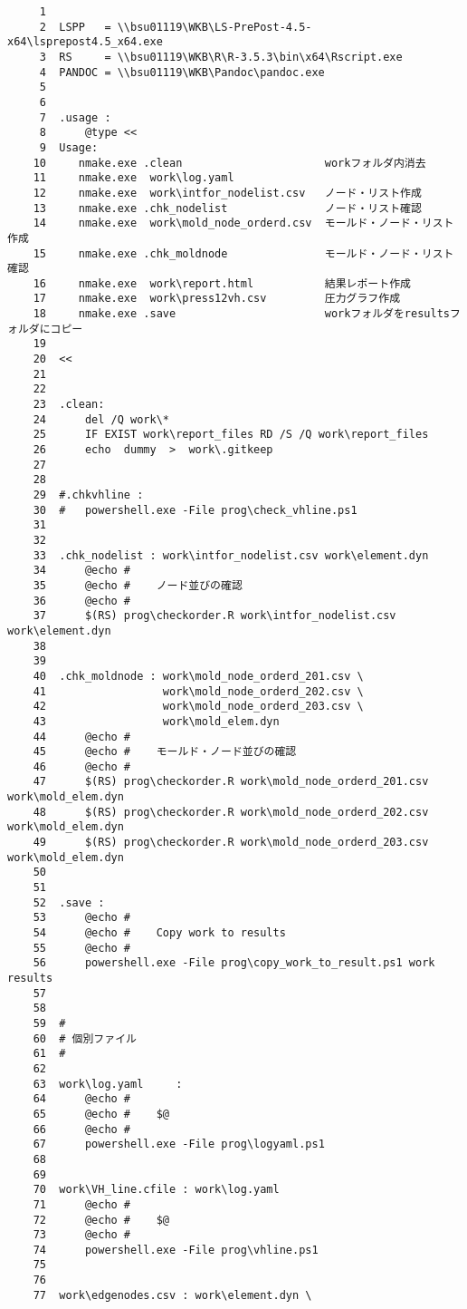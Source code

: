 \documentclass[dvipdfmx]{jsarticle}
\begin{document}
\begin{verbatim}
     1	
     2	LSPP   = \\bsu01119\WKB\LS-PrePost-4.5-x64\lsprepost4.5_x64.exe
     3	RS     = \\bsu01119\WKB\R\R-3.5.3\bin\x64\Rscript.exe
     4	PANDOC = \\bsu01119\WKB\Pandoc\pandoc.exe
     5	
     6	
     7	.usage :
     8		@type <<
     9	Usage:
    10	   nmake.exe .clean                      workフォルダ内消去
    11	   nmake.exe  work\log.yaml
    12	   nmake.exe  work\intfor_nodelist.csv   ノード・リスト作成
    13	   nmake.exe .chk_nodelist               ノード・リスト確認
    14	   nmake.exe  work\mold_node_orderd.csv  モールド・ノード・リスト作成
    15	   nmake.exe .chk_moldnode               モールド・ノード・リスト確認
    16	   nmake.exe  work\report.html           結果レポート作成
    17	   nmake.exe  work\press12vh.csv         圧力グラフ作成
    18	   nmake.exe .save                       workフォルダをresultsフォルダにコピー
    19	
    20	<<
    21	
    22	
    23	.clean:
    24		del /Q work\*
    25		IF EXIST work\report_files RD /S /Q work\report_files
    26		echo  dummy  >  work\.gitkeep
    27	
    28	
    29	#.chkvhline :
    30	#	powershell.exe -File prog\check_vhline.ps1
    31	
    32	
    33	.chk_nodelist : work\intfor_nodelist.csv work\element.dyn
    34		@echo #
    35		@echo #    ノード並びの確認
    36		@echo #
    37		$(RS) prog\checkorder.R work\intfor_nodelist.csv work\element.dyn
    38	
    39	
    40	.chk_moldnode : work\mold_node_orderd_201.csv \
    41	                work\mold_node_orderd_202.csv \
    42	                work\mold_node_orderd_203.csv \
    43					work\mold_elem.dyn
    44		@echo #
    45		@echo #    モールド・ノード並びの確認
    46		@echo #
    47		$(RS) prog\checkorder.R work\mold_node_orderd_201.csv work\mold_elem.dyn
    48		$(RS) prog\checkorder.R work\mold_node_orderd_202.csv work\mold_elem.dyn
    49		$(RS) prog\checkorder.R work\mold_node_orderd_203.csv work\mold_elem.dyn
    50	
    51	
    52	.save :
    53		@echo #
    54		@echo #    Copy work to results
    55		@echo #
    56		powershell.exe -File prog\copy_work_to_result.ps1 work results
    57	
    58	
    59	#
    60	# 個別ファイル
    61	#
    62	
    63	work\log.yaml     :
    64		@echo #
    65		@echo #    $@
    66		@echo #
    67		powershell.exe -File prog\logyaml.ps1
    68	
    69	
    70	work\VH_line.cfile : work\log.yaml
    71		@echo #
    72		@echo #    $@
    73		@echo #
    74		powershell.exe -File prog\vhline.ps1
    75	
    76	
    77	work\edgenodes.csv : work\element.dyn \

\end{verbatim}
\end{document}
